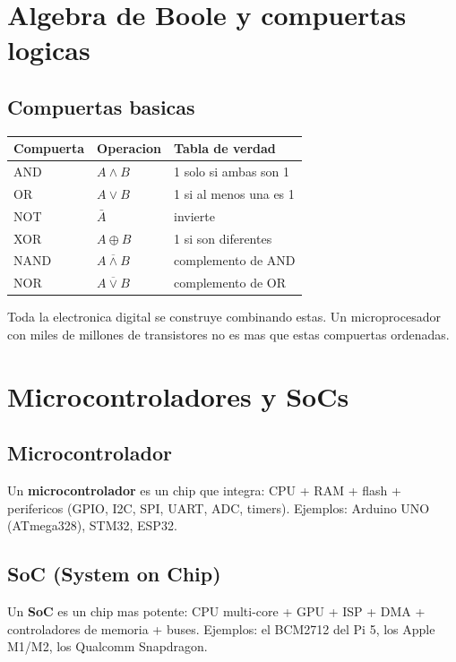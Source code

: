 \documentclass[11pt,a4paper,oneside,openright]{book}
\begin{document}
\chapter{Algebra de Boole y compuertas logicas}

\section{Compuertas basicas}

\begin{center}
\begin{tabular}{lll}
\toprule
\textbf{Compuerta} & \textbf{Operacion} & \textbf{Tabla de verdad} \\
\midrule
AND   & $A \wedge B$           & 1 solo si ambas son 1 \\
OR    & $A \vee B$             & 1 si al menos una es 1 \\
NOT   & $\bar{A}$              & invierte \\
XOR   & $A \oplus B$           & 1 si son diferentes \\
NAND  & $\overline{A \wedge B}$ & complemento de AND \\
NOR   & $\overline{A \vee B}$  & complemento de OR \\
\bottomrule
\end{tabular}
\end{center}

Toda la electronica digital se construye combinando estas. Un microprocesador
con miles de millones de transistores no es mas que estas compuertas
ordenadas.

\chapter{Microcontroladores y SoCs}

\section{Microcontrolador}

Un \textbf{microcontrolador} es un chip que integra: CPU + RAM + flash +
perifericos (GPIO, I2C, SPI, UART, ADC, timers). Ejemplos: Arduino UNO
(ATmega328), STM32, ESP32.

\section{SoC (System on Chip)}

Un \textbf{SoC} es un chip mas potente: CPU multi-core + GPU + ISP + DMA +
controladores de memoria + buses. Ejemplos: el BCM2712 del Pi 5, los
Apple M1/M2, los Qualcomm Snapdragon.
\end{document}
